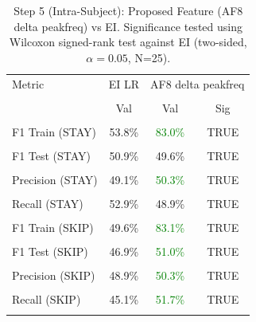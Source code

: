 \begin{table}[H]
\centering
\begin{tabular}{lccc}
\hline
Metric & EI LR & \multicolumn{2}{c}{AF8 delta peakfreq} \\\\
 & Val & Val & Sig \\\\
\hline
F1 Train (STAY) & 53.8\% & \textcolor{green}{83.0\%} & TRUE \\\\
F1 Test (STAY) & 50.9\% & 49.6\% & TRUE \\\\
Precision (STAY) & 49.1\% & \textcolor{green}{50.3\%} & TRUE \\\\
Recall (STAY) & 52.9\% & 48.9\% & TRUE \\\\
F1 Train (SKIP) & 49.6\% & \textcolor{green}{83.1\%} & TRUE \\\\
F1 Test (SKIP) & 46.9\% & \textcolor{green}{51.0\%} & TRUE \\\\
Precision (SKIP) & 48.9\% & \textcolor{green}{50.3\%} & TRUE \\\\
Recall (SKIP) & 45.1\% & \textcolor{green}{51.7\%} & TRUE \\\\
\hline
\end{tabular}
\caption{Step 5 (Intra-Subject): Proposed Feature (AF8 delta peakfreq) vs EI. Significance tested using Wilcoxon signed-rank test against EI (two-sided, $\alpha=0.05$, N=25).}
\label{tab:metrics_5_intra_2}
\end{table}